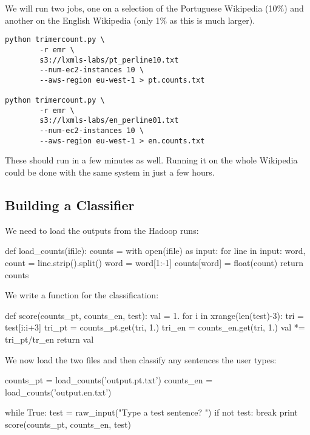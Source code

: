 We will run two jobs, one on a selection of the Portuguese Wikipedia (10\%) and
another on the English Wikipedia (only 1\% as this is much larger).

\begin{verbatim}
python trimercount.py \
        -r emr \
        s3://lxmls-labs/pt_perline10.txt
        --num-ec2-instances 10 \
        --aws-region eu-west-1 > pt.counts.txt

python trimercount.py \
        -r emr \
        s3://lxmls-labs/en_perline01.txt
        --num-ec2-instances 10 \
        --aws-region eu-west-1 > en.counts.txt
\end{verbatim}

These should run in a few minutes as well. Running it on the whole Wikipedia
could be done with the same system in just a few hours.

\subsection{Building a Classifier}

We need to load the outputs from the Hadoop runs:

\begin{python}
def load_counts(ifile):
    counts = {}
    with open(ifile) as input:
        for line in input:
            word, count = line.strip().split()
            word = word[1:-1]
            counts[word] = float(count)
    return counts
\end{python}

We write a function for the classification:

\begin{python}
def score(counts_pt, counts_en, test):
    val = 1.
    for i in xrange(len(test)-3):
        tri = test[i:i+3]
        tri_pt = counts_pt.get(tri, 1.)
        tri_en = counts_en.get(tri, 1.)
        val *= tri_pt/tr_en
    return val
\end{python}

We now load the two files and then classify any sentences the user types:

\begin{python}
counts_pt = load_counts('output.pt.txt')
counts_en = load_counts('output.en.txt')

while True:
    test = raw_input("Type a test sentence? ")
    if not test: break
    print score(counts_pt, counts_en, test)
\end{python}


